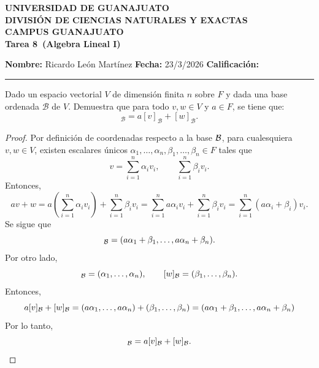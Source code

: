 \documentclass[12pt,a4paper]{article}
\newcommand{\paren}[1]{\left( #1 \right)}
\newcommand{\alumno}{Ricardo León Martínez}
\newcommand{\materia}{Algebra Lineal I}
\newcommand{\tarea}{Tarea 8}
\newcommand{\fecha}{23/3/2026}
\begin{document}
    \begin{center}
        {\large\textbf{UNIVERSIDAD DE GUANAJUATO}}\\[0.3cm]
        {\normalsize\textbf{DIVISIÓN DE CIENCIAS NATURALES Y EXACTAS}}\\
        {\normalsize\textbf{CAMPUS GUANAJUATO}}\\[1cm]

        {\Large\textbf{\tarea\ (\materia)}}\\[1cm]
    \end{center}

    \noindent
    \textbf{Nombre:} \alumno 
    \hfill 
    \textbf{Fecha:} \fecha 
    \hfill 
    \textbf{Calificación:} \rule{3cm}{0.4pt}

    \vspace{0.3cm}

    \begin{mdframed}[style=mdbluebox,frametitle={Ejercicio 1}]
        Dado un espacio vectorial $V$ de dimensión finita $n$ sobre $F$ y dada una base ordenada $\mathcal{B}$ de $V$. Demuestra
        que para todo $v,w\in V$ y $a\in F$, se tiene que:
        \begin{equation*}
            [av+w]_{\mathcal{B}}=a[v]_{\mathcal{B}}+[w]_{\mathcal{B}}.
        \end{equation*}
    \end{mdframed}

    \begin{proof}
        Por definición de coordenadas respecto a la base $\mathcal{B}$, para cualesquiera $v,w\in V$, existen
        escalares únicos $\alpha_{1},\dots,\alpha_{n},\beta_{1},\dots,\beta_{n}\in F$ tales que
        \begin{equation*}
            v=\sum_{i=1}^{n}\alpha_{i}v_{i},\qquad\sum_{i=1}^{n}\beta_{i}v_{i}.
        \end{equation*}
        Entonces,
        \begin{equation*}
            av+w=a\paren{\sum_{i=1}^{n}\alpha_{i}v_{i}}+\sum_{i=1}^{n}\beta_{i}v_{i}=\sum_{i=1}^{n}a\alpha_{i}v_{i}+\sum_{i=1}^{n}\beta_{i}v_{i}=\sum_{i=1}^{n}(a\alpha_{i}+\beta_{i})v_{i}.
        \end{equation*}
        Se sigue que
        \begin{equation*}
            [av+w]_{\BB}=(a\alpha_{1}+\beta_{1},\dots,a\alpha_{n}+\beta_{n}).
        \end{equation*}
        Por otro lado,
        \begin{equation*}
            [v]_{\BB}=(\alpha_{1},\dots,\alpha_{n}),\qquad [w]_{\BB}=(\beta_{1},\dots,\beta_{n}).
        \end{equation*}
        Entonces,
        \begin{equation*}
            a[v]_{\mathcal{B}}+[w]_{\mathcal{B}}=(a\alpha_{1},\dots,a\alpha_{n})+(\beta_{1},\dots,\beta_{n})=(a\alpha_{1}+\beta_{1},\dots,a\alpha_{n}+\beta_{n})
        \end{equation*}
        Por lo tanto,
        \begin{equation*}
            [av+w]_{\BB}=a[v]_{\BB}+[w]_{\BB}.
        \end{equation*}
    \end{proof}
\end{document}
